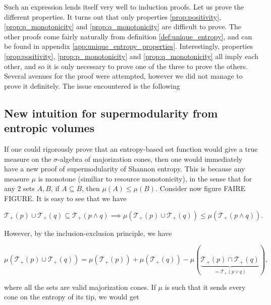 Such an expression lends itself very well to induction proofs. Let us prove the different properties. It turns out that only properties \ref{prop:positivity}, \ref{prop:p_monotonicity} and \ref{prop:q_monotonicity} are difficult to prove. The other proofs come fairly naturally from definition \ref{def:unique_entropy}, and can be found in appendix \ref{app:unique_entropy_properties}. Interestingly, properties \ref{prop:positivity}, \ref{prop:p_monotonicity} and \ref{prop:q_monotonicity} all imply each other, and so it is only necessary to prove one of the three to prove the others. Several avenues for the proof were attempted, however we did not manage to prove it definitely. The issue encountered is the following



\subsection{New intuition for supermodularity from entropic volumes} \label{sec:supermodularity_intuition}

If one could rigorously prove that an entropy-based set function would give a true measure on the $\sigma$-algebra of majorization cones, then one would immediately have a new proof of supermodularity of Shannon entropy. This is because any measure $\mu$ is monotone (similiar to resource monotonicity), in the sense that for any 2 sets $A, B$, if $A \subseteq B$, then $\mu(A) \leq \mu(B)$. Consider now figure FAIRE FIGURE. It is easy to see that we have

\begin{equation}
    \mathcal{T}_+(p) \cup \mathcal{T}_+(q) \subseteq \mathcal{T}_+(p \wedge q) \implies \mu\left(\mathcal{T}_+(p) \cup \mathcal{T}_+(q)\right) \leq \mu\left(\mathcal{T}_+(p \wedge q)\right).
\end{equation}

\noindent However, by the inclusion-exclusion principle, we have 

\begin{equation}
    \mu\left(\mathcal{T}_+(p) \cup \mathcal{T}_+(q)\right) = \mu\left(\mathcal{T}_+(p)\right) + \mu\left(\mathcal{T}_+(q)\right) - \mu\left(\underbrace{\mathcal{T}_+(p) \cap \mathcal{T}_+(q)}_{= \mathcal{T}_+(p \vee q)}\right),
\end{equation}

\noindent where all the sets are valid majorization cones. If $\mu$ is such that it sends every cone on the entropy of its tip, we would get

